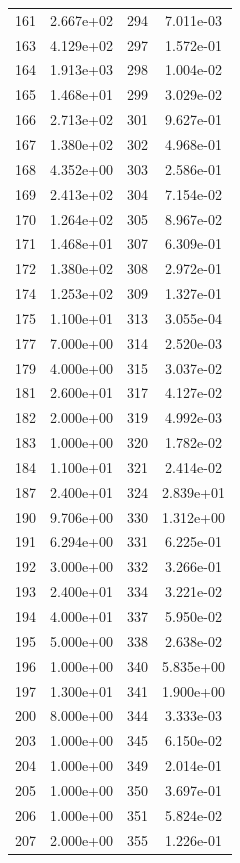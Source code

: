 \documentclass[12pt]{article}
\begin{document}
\begin{longtable}{@{}cccc@{}}
161 & 2.667e+02 & 294 & 7.011e-03 \\
163 & 4.129e+02 & 297 & 1.572e-01 \\
164 & 1.913e+03 & 298 & 1.004e-02 \\
165 & 1.468e+01 & 299 & 3.029e-02 \\
166 & 2.713e+02 & 301 & 9.627e-01 \\
167 & 1.380e+02 & 302 & 4.968e-01 \\
168 & 4.352e+00 & 303 & 2.586e-01 \\
169 & 2.413e+02 & 304 & 7.154e-02 \\
170 & 1.264e+02 & 305 & 8.967e-02 \\
171 & 1.468e+01 & 307 & 6.309e-01 \\
172 & 1.380e+02 & 308 & 2.972e-01 \\
174 & 1.253e+02 & 309 & 1.327e-01 \\
175 & 1.100e+01 & 313 & 3.055e-04 \\
177 & 7.000e+00 & 314 & 2.520e-03 \\
179 & 4.000e+00 & 315 & 3.037e-02 \\
181 & 2.600e+01 & 317 & 4.127e-02 \\
182 & 2.000e+00 & 319 & 4.992e-03 \\
183 & 1.000e+00 & 320 & 1.782e-02 \\
184 & 1.100e+01 & 321 & 2.414e-02 \\
187 & 2.400e+01 & 324 & 2.839e+01 \\
190 & 9.706e+00 & 330 & 1.312e+00 \\
191 & 6.294e+00 & 331 & 6.225e-01 \\
192 & 3.000e+00 & 332 & 3.266e-01 \\
193 & 2.400e+01 & 334 & 3.221e-02 \\
194 & 4.000e+01 & 337 & 5.950e-02 \\
195 & 5.000e+00 & 338 & 2.638e-02 \\
196 & 1.000e+00 & 340 & 5.835e+00 \\
197 & 1.300e+01 & 341 & 1.900e+00 \\
200 & 8.000e+00 & 344 & 3.333e-03 \\
203 & 1.000e+00 & 345 & 6.150e-02 \\
204 & 1.000e+00 & 349 & 2.014e-01 \\
205 & 1.000e+00 & 350 & 3.697e-01 \\
206 & 1.000e+00 & 351 & 5.824e-02 \\
207 & 2.000e+00 & 355 & 1.226e-01 \\

\end{longtable}
\end{document}
